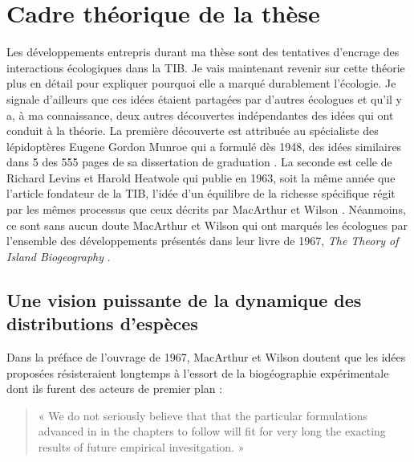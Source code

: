 \section*{Cadre théorique de la
thèse}\label{cadre-thuxe9orique-de-la-thuxe8se}

Les développements entrepris durant ma thèse sont des tentatives
d'encrage des interactions écologiques dans la TIB. Je vais maintenant
revenir sur cette théorie plus en détail pour expliquer pourquoi elle a
marqué durablement l'écologie. Je signale d'ailleurs que ces idées
étaient partagées par d'autres écologues et qu'il y a, à ma
connaissance, deux autres découvertes indépendantes des idées qui ont
conduit à la théorie. La première découverte est attribuée au
spécialiste des lépidoptères Eugene Gordon Munroe qui a formulé dès
1948, des idées similaires dans 5 des 555 pages de sa dissertation de
graduation \citep[\citet{Lomolino2009}]{Brown1989}. La seconde est celle
de Richard Levins et Harold Heatwole qui publie en 1963, soit la même
année que l'article fondateur de la TIB, l'idée d'un équilibre de la
richesse spécifique régit par les mêmes processus que ceux décrits par
MacArthur et Wilson \citep{Levins1963}. Néanmoins, ce sont sans aucun
doute MacArthur et Wilson qui ont marqués les écologues par l'ensemble
des développements présentés dans leur livre de 1967, \emph{The Theory
of Island Biogeography} \citep{MacArthur1967a}.

\subsection*{Une vision puissante de la dynamique des distributions
d'espèces}\label{une-vision-puissante-de-la-dynamique-des-distributions-despuxe8ces}

Dans la préface de l'ouvrage de 1967, MacArthur et Wilson doutent que
les idées proposées résisteraient longtemps à l'essort de la
biogéographie expérimentale dont ils furent des acteurs de premier plan
:

\begin{quote}
« We do not seriously believe that that the particular formulations
advanced in in the chapters to follow will fit for very long the
exacting results of future empirical invesitgation. »
\end{quote}

